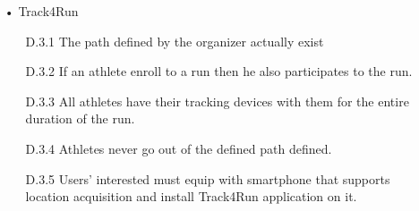 \begin{enumerate}
\item[•] {\Large Track4Run}
	\begin{enumerate}
	\item [D.3.1] The path defined by the organizer actually exist
    \item [D.3.2] If an athlete enroll to a run then he also participates to the run.
    \item [D.3.3] All athletes have their tracking devices with them for the entire duration of the run.
    \item [D.3.4] Athletes never go out of the defined path defined.
    \item [D.3.5] Users' interested must equip with smartphone that supports location acquisition and install Track4Run application on it.
	\end{enumerate}
	
\end{enumerate}